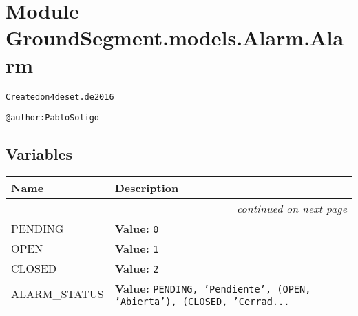 %
%
%


\section{Module GroundSegment.models.Alarm.Alarm}

    \label{GroundSegment:models:Alarm:Alarm}
\begin{alltt}

Created on 4 de set. de 2016

@author: Pablo Soligo
\end{alltt}



  \subsection{Variables}

    \vspace{-1cm}
\hspace{\varindent}\begin{longtable}{|p{\varnamewidth}|p{\vardescrwidth}|l}
\cline{1-2}
\cline{1-2} \centering \textbf{Name} & \centering \textbf{Description}& \\
\cline{1-2}
\endhead\cline{1-2}\multicolumn{3}{r}{\small\textit{continued on next page}}\\\endfoot\cline{1-2}
\endlastfoot\raggedright P\-E\-N\-D\-I\-N\-G\- & \raggedright \textbf{Value:} 
{\tt 0}&\\
\cline{1-2}
\raggedright O\-P\-E\-N\- & \raggedright \textbf{Value:} 
{\tt 1}&\\
\cline{1-2}
\raggedright C\-L\-O\-S\-E\-D\- & \raggedright \textbf{Value:} 
{\tt 2}&\\
\cline{1-2}
\raggedright A\-L\-A\-R\-M\-\_\-S\-T\-A\-T\-U\-S\- & \raggedright \textbf{Value:} 
{\tt PENDING, 'Pendiente', (OPEN, 'Abierta'), (CLOSED, 'Cerrad\texttt{...}}&\\
\cline{1-2}
\end{longtable}


